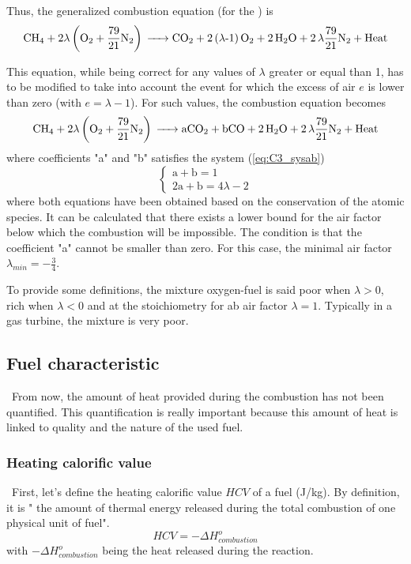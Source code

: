 Thus, the generalized combustion equation (for the ) is
\begin{equation}
\ce{CH4 +}2\lambda \left(\ce{O2}+\frac{79}{21}\ce{N2}\right) \ce{-> CO2 + 2(\lambda-1)O2 + 2H2O + 2\lambda\frac{79}{21}N2 + \text{Heat}}\label{eq:C3_chemgeng0}
\end{equation}

This equation, while being correct for any values of $\lambda$ greater or equal than 1, has to be modified to take into account the event for which the excess of air $e$ is lower than zero (with $e=\lambda -1$). For such values, the combustion equation becomes 
\begin{equation}
\ce{CH4 +}2\lambda \left(\ce{O2}+\frac{79}{21}\ce{N2}\right) \ce{-> aCO2 + bCO + 2H2O + 2\lambda\frac{79}{21}N2 + \text{Heat}}\label{eq:C3_chemgeng1}
\end{equation}
where coefficients "a" and "b" satisfies the system (\ref{eq:C3_sysab})
\begin{equation}
\begin{cases}
\text{a} + \text{b} = 1\\
2\text{a} + \text{b} = 4\lambda - 2
\end{cases}\label{eq:C3_sysab}
\end{equation}
where both equations have been obtained based on the conservation of the atomic species. It can be calculated that there exists a lower bound for the air factor below which the combustion will be impossible. The condition is that the coefficient "a" cannot be smaller than zero. For this case, the minimal air factor $\lambda_{min} =-\frac{3}{4}$.

To provide some definitions, the mixture oxygen-fuel is said poor when $\lambda>0$, rich when $\lambda<0$ and at the stoichiometry for ab air factor $\lambda=1$. Typically in a gas turbine, the mixture is very poor.
\newpage
\subsection{Fuel characteristic}
\quad\, From now, the amount of heat provided during the combustion has not been quantified. This quantification is really important because this amount of heat is linked to quality and the nature of the used fuel.

\subsubsection{Heating calorific value}
\quad\, First, let's define the heating calorific value $HCV$ of a fuel (J/kg). By definition, it is " the amount of thermal energy released during the total combustion of one physical unit of fuel"\citep{Leonard2018}. 
\begin{equation}
HCV = -\Delta H^o_{combustion} \label{eq:C3_HCV1}
\end{equation}
with $-\Delta H^o_{combustion}$ being the heat released during the reaction.

